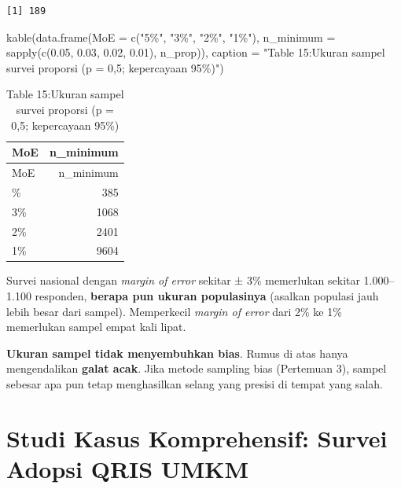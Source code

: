 \documentclass[
  indonesian,
  letterpaper,
]{book}
\newenvironment{Shaded}{\begin{snugshade}}{\end{snugshade}}
\newcommand{\AttributeTok}[1]{\textcolor[rgb]{0.40,0.45,0.13}{#1}}
\newcommand{\FloatTok}[1]{\textcolor[rgb]{0.68,0.00,0.00}{#1}}
\newcommand{\FunctionTok}[1]{\textcolor[rgb]{0.28,0.35,0.67}{#1}}
\newcommand{\NormalTok}[1]{\textcolor[rgb]{0.00,0.23,0.31}{#1}}
\newcommand{\StringTok}[1]{\textcolor[rgb]{0.13,0.47,0.30}{#1}}
\begin{document}
\begin{verbatim}
[1] 189
\end{verbatim}

\begin{Shaded}
\begin{Highlighting}[]
\FunctionTok{kable}\NormalTok{(}\FunctionTok{data.frame}\NormalTok{(}\AttributeTok{MoE =} \FunctionTok{c}\NormalTok{(}\StringTok{"5\%"}\NormalTok{, }\StringTok{"3\%"}\NormalTok{, }\StringTok{"2\%"}\NormalTok{, }\StringTok{"1\%"}\NormalTok{),}
\AttributeTok{n\_minimum =} \FunctionTok{sapply}\NormalTok{(}\FunctionTok{c}\NormalTok{(}\FloatTok{0.05}\NormalTok{, }\FloatTok{0.03}\NormalTok{, }\FloatTok{0.02}\NormalTok{, }\FloatTok{0.01}\NormalTok{), n\_prop)),}
\AttributeTok{caption =} \StringTok{"Table 15:Ukuran sampel survei proporsi (p = 0,5; kepercayaan 95\%)"}\NormalTok{)}
\end{Highlighting}
\end{Shaded}

\begin{longtable}[]{@{}lr@{}}
\caption{Table 15:Ukuran sampel survei proporsi (p = 0,5; kepercayaan
95\%)}\tabularnewline
\toprule\noalign{}
MoE & n\_minimum \\
\midrule\noalign{}
\endfirsthead
\toprule\noalign{}
MoE & n\_minimum \\
\midrule\noalign{}
\endhead
\bottomrule\noalign{}
\endlastfoot
5\% & 385 \\
3\% & 1068 \\
2\% & 2401 \\
1\% & 9604 \\
\end{longtable}

Survei nasional dengan \emph{margin of error} sekitar ± 3\% memerlukan
sekitar 1.000--1.100 responden, \textbf{berapa pun ukuran populasinya}
(asalkan populasi jauh lebih besar dari sampel). Memperkecil
\emph{margin of error} dari 2\% ke 1\% memerlukan sampel empat kali
lipat.

\textbf{Ukuran sampel tidak menyembuhkan bias}. Rumus di atas hanya
mengendalikan \textbf{galat acak}. Jika metode sampling bias (Pertemuan
3), sampel sebesar apa pun tetap menghasilkan selang yang presisi di
tempat yang salah.


\chapter{Studi Kasus Komprehensif: Survei Adopsi QRIS
UMKM}\label{studi-kasus-komprehensif-survei-adopsi-qris-umkm}
\end{document}
